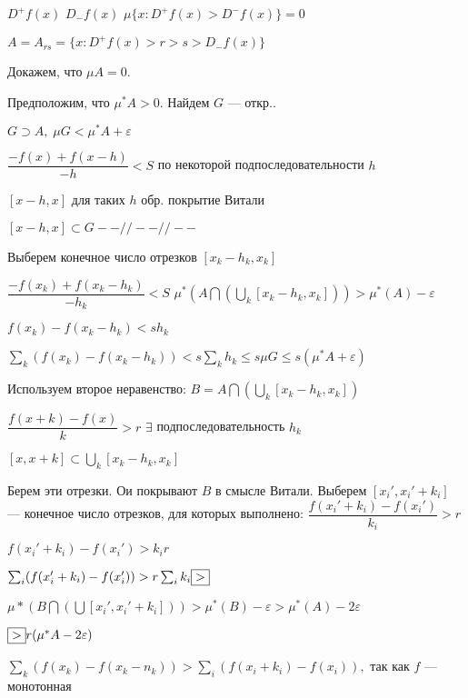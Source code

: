 $D^+ f(x)$ $D_- f(x)$ $\mu\{x: D^+ f(x) > D^- f(x)\} = 0$

$A = A_{rs} = \{x: D^+ f(x) > r > s > D_- f(x)\}$

Докажем, что $\mu A = 0$.

Предположим, что $\mu^* A > 0$. Найдем $G$ --- откр..

$G \supset A, \; \mu G < \mu^* A + \varepsilon$

%
%
%
%
%
%
%
%
%
%
%

$\dfrac{-f(x) + f(x-h)}{-h} < S$ по некоторой
подпоследовательности $h$

$[x-h, x]$ для таких $h$ обр. покрытие Витали

$[x - h, x] \subset G    --//--//--$

Выберем конечное число отрезков $[x_k - h_k, x_k]$

$\dfrac{-f(x_k) + f(x_k - h_k)}{-h_k} < S$ $\mu^* (A \bigcap
(\bigcup_k [x_k - h_k, x_k])) > \mu^*(A) - \varepsilon$

$f(x_k) - f(x_k - h_k) < sh_k$

$\sum_k (f(x_k) - f(x_k - h_k)) < s \sum_k h_k \leqslant s \mu G
\leqslant s(\mu^* A + \varepsilon)$

Используем второе неравенство: $B = A \bigcap (\bigcup_k [x_k -
h_k, x_k])$


$\dfrac{f(x+k) - f(x)}{k} > r$   $\exists$ подпоследовательность
$h_k$

$[x, x + k] \subset \bigcup_k [x_k - h_k,x_k]$

Берем эти отрезки. Ои покрывают $B$ в смысле Витали. Выберем
$[x_i', x_i'+ k_i]$ --- конечное число отрезков, для которых
выполнено:
 $\dfrac{f(x_i' + k_i) - f(x_i')}{k_i} > r$

$f(x_i' + k_i) - f(x_i') > k_i r$

$\sum_i (f(x_i' + k_i) - f(x_i')) > r \sum_i k_i \fbox{>}$

$\mu* (B \bigcap (\bigcup[x_i', x_i' + k_i])) > \mu^*(B) -
\varepsilon > \mu^*(A) - 2\varepsilon$

$\fbox{>} r (\mu^*A - 2\varepsilon)$

$\sum_k (f(x_k) - f(x_k - n_k)) > \sum_i (f(x_i + k_i) - f(x_i)),$
так как $f$ --- монотонная

